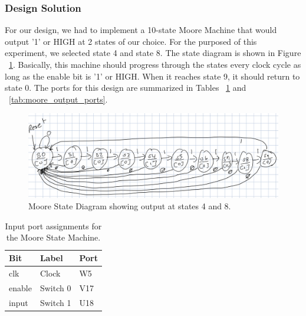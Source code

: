 \documentclass[11pt]{article}
\begin{document}
\subsubsection{Design Solution}
For our design, we had to implement a 10-state Moore Machine that would output '1' or HIGH at 2 states of our choice. For the purposed of this experiment, we selected state 4 and state 8. The state diagram is shown in Figure ~\ref{fig:moore_state_diagram}. Basically, this machine should progress through the states every clock cycle as long as the enable bit is '1' or HIGH. When it reaches state 9, it should return to state 0. The ports for this design are summarized in Tables ~\ref{tab:moore_input_ports} and ~\ref{tab:moore_output_ports}.

\begin{center}
\begin{figure}
	\includegraphics[width=\textwidth]{images/img1.jpg}
	\caption{\label{fig:moore_state_diagram}Moore State Diagram showing output at states 4 and 8.}
\end{figure}
\end{center}

\begin{table}[H]
\begin{center}
\begin{tabular}{| l | l | l |}
	\hline
	Bit & Label & Port \\ \hline
	clk & Clock & W5 \\ \hline
	enable & Switch 0 & V17 \\ \hline
	input & Switch 1 & U18 \\ \hline
\end{tabular}
\caption{\label{tab:moore_input_ports}Input port assignments for the Moore State Machine.}
\end{center}
\end{table}
\end{document}
